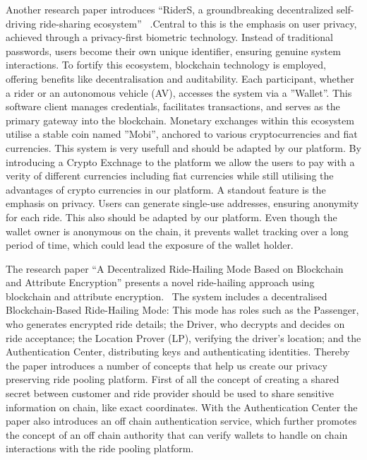 Another research paper introduces ``RiderS, a groundbreaking decentralized self-driving ride-sharing ecosystem'' ~\cite{Bathen.}.Central to this is the emphasis on user privacy, achieved through a privacy-first biometric technology. Instead of traditional passwords, users become their own unique identifier, ensuring genuine system interactions. To fortify this ecosystem, blockchain technology is employed, offering benefits like decentralisation and auditability. Each participant, whether a rider or an autonomous vehicle (AV), accesses the system via a ''Wallet''. This software client manages credentials, facilitates transactions, and serves as the primary gateway into the blockchain. Monetary exchanges within this ecosystem utilise a stable coin named ''Mobi'', anchored to various cryptocurrencies and fiat currencies. This system is very usefull and should be adapted by our platform. By introducing a Crypto Exchnage to the platform we allow the users to pay with a verity of different currencies including fiat currencies while still utilising the advantages of crypto currencies   in our platform. A standout feature is the emphasis on privacy. Users can generate single-use addresses, ensuring anonymity for each ride. This also should be adapted by our platform. Even though the wallet owner is anonymous on the chain, it prevents wallet tracking over a long period of time, which could lead the exposure of the wallet holder.

The research paper ``A Decentralized Ride-Hailing Mode Based on Blockchain and Attribute Encryption'' presents a novel ride-hailing approach using blockchain and attribute encryption.~\cite{Zhang.} 
The system includes a decentralised Blockchain-Based Ride-Hailing Mode: This mode has roles such as the Passenger, who generates encrypted ride details; the Driver, who decrypts and decides on ride acceptance; the Location Prover (LP), verifying the driver's location; and the Authentication Center, distributing keys and authenticating identities. Thereby the paper introduces a number of concepts that help us create our privacy preserving ride pooling platform. First of all the concept of creating a shared secret between customer and ride provider should be used  to share sensitive information on chain, like exact coordinates. With the  Authentication Center the paper also introduces an off chain authentication service, which further promotes the concept of an off chain authority that can verify  wallets to handle on chain interactions with the ride pooling platform.

